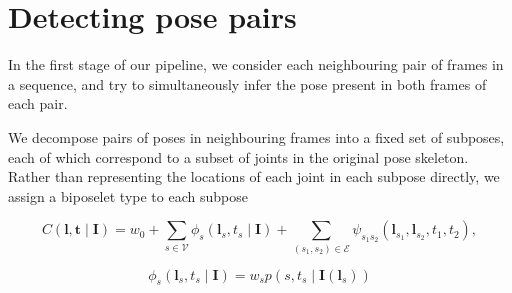 \documentclass{article}
\renewcommand{\vec}{\mathbf}
\newcommand{\mat}{\mathbf}
\begin{document}
\section{Detecting pose pairs}


In the first stage of our pipeline, we consider each neighbouring pair of frames
in a sequence, and try to simultaneously infer the pose present in both frames
of each pair. %

We decompose pairs of poses in neighbouring frames into a fixed set of subposes,
each of which correspond to a subset of joints in the original pose skeleton.
Rather than representing the locations of each joint in each subpose directly,
we assign a biposelet type to each subpose %

\begin{equation}
\label{eqn:full-cost}
C(\vec l, \vec t \mid \mat I)
= w_0 + \sum_{s \in \mathcal V} \phi_s(\vec l_s, t_s \mid \mat I)
+ \sum_{(s_1, s_2) \in \mathcal E}
    \psi_{s_1 s_2}(\vec l_{s_1}, \vec l_{s_2}, t_1, t_2),
\end{equation}

\begin{equation}
\label{eqn:unary-cost}
\phi_s(\vec l_s, t_s \mid \mat I) = w_s p(s, t_s \mid \mat I(\vec l_s))
\end{equation}
\end{document}
